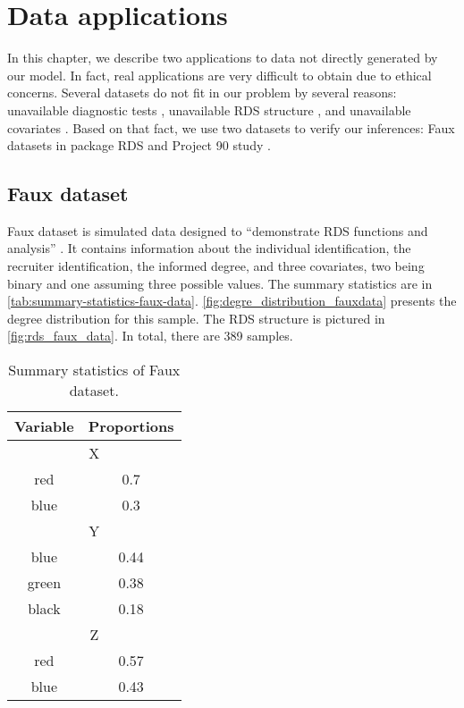 \chapter{Data applications}
\label{ch:real_data_applications}

In this chapter, we describe two applications to data not directly generated
by our model. In fact, real applications are very difficult to obtain due to
ethical concerns. Several datasets do not fit in our problem by
several reasons: unavailable diagnostic tests \cite{perestroika2021sexual,
khoury2020hard, salganik2011assessing}, unavailable RDS structure
\cite{coutinho2019risks, kendall201912}, and unavailable covariates
\cite{wu2017using}. Based on that fact, we use two datasets to verify our
inferences: Faux datasets in package RDS \cite{rds_package} and Project 90
study \cite{project90}.

\section{Faux dataset}

Faux dataset is simulated data designed to ``demonstrate RDS functions and
analysis'' \cite[p. 15]{rds_package}. It contains information about the
individual identification, the recruiter identification, the informed degree,
and three covariates, two being binary and one assuming three possible values.
The summary statistics are in \autoref{tab:summary-statistics-faux-data}.
\autoref{fig:degre_distribution_fauxdata} presents the degree distribution for
this sample. The RDS structure is pictured in \autoref{fig:rds_faux_data}. In
total, there are 389 samples. 

\begin{table}[htbp]
    \centering
    \caption{\label{tab:summary-statistics-faux-data}Summary statistics of
    Faux dataset.}
    \begin{tabular}{cc}
    \hline
    Variable & Proportions \\ \hline
    \multicolumn{2}{c}{X} \\ \hline
    red & 0.7 \\
    blue & 0.3 \\ \hline
    \multicolumn{2}{c}{Y} \\ \hline
    blue & 0.44 \\
    green & 0.38 \\
    black & 0.18 \\ \hline
    \multicolumn{2}{c}{Z} \\ \hline
    red & 0.57 \\
    blue & 0.43 \\ \hline
    \end{tabular}
\end{table}

